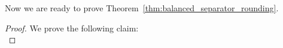 \documentclass[11pt]{amsart}
\newtheorem{claim}{Claim}[theorem]
\newcommand{\lpopt}{LP_{opt}}
\begin{document}
Now we are ready to prove Theorem~\ref{thm:balanced_separator_rounding}.

\LPoptVSintegral*
\begin{proof}
    We prove the following claim:\\[-4pt]
    

\end{proof}
\end{document}
